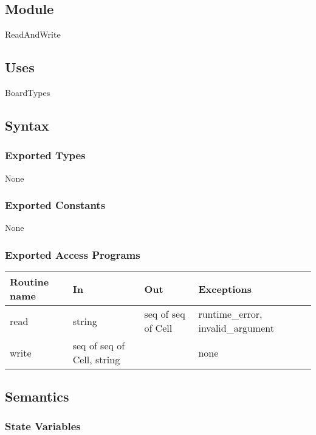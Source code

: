 \documentclass[12pt]{article}
\begin{document}
\subsection* {Module}

ReadAndWrite

\subsection* {Uses}

BoardTypes

\subsection* {Syntax}

\subsubsection* {Exported Types}

None

\subsubsection* {Exported Constants}

None

\subsubsection* {Exported Access Programs}

\begin{tabular}{| l | l | l | p{8cm} |}
\hline
\textbf{Routine name} & \textbf{In} & \textbf{Out} & \textbf{Exceptions}\\
\hline
read & string & seq of seq of Cell & runtime\_error, invalid\_argument\\
\hline
write & seq of seq of Cell, string &  & none\\
\hline

\end{tabular}

\subsection* {Semantics}

\subsubsection* {State Variables}
\end{document}
